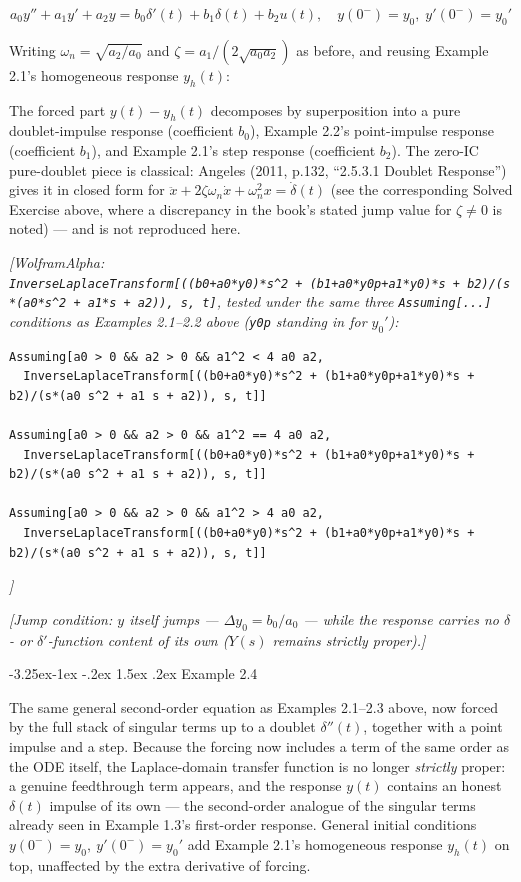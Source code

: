 \documentclass[
  11pt,
]{article}
\makeatletter
\renewcommand\paragraph{\@startsection{paragraph}{4}{\z@}%
                                     {-3.25ex\@plus -1ex \@minus -.2ex}%
                                     {1.5ex \@plus .2ex}%
                                     {\normalfont\normalsize\bfseries}}
\makeatother
\begin{document}
\[
a_0 y'' + a_1 y' + a_2 y = b_0 \delta'(t) + b_1 \delta(t) + b_2 u(t), \quad y(0^-) = y_0, \; y'(0^-) = y_0'
\]

Writing \(\omega_n = \sqrt{a_2/a_0}\) and
\(\zeta = a_1/(2\sqrt{a_0 a_2})\) as before, and reusing Example 2.1's
homogeneous response \(y_h(t)\):

The forced part \(y(t)-y_h(t)\) decomposes by superposition into a pure
doublet-impulse response (coefficient \(b_0\)), Example 2.2's
point-impulse response (coefficient \(b_1\)), and Example 2.1's step
response (coefficient \(b_2\)). The zero-IC pure-doublet piece is
classical: Angeles (2011, p.132, ``2.5.3.1 Doublet Response'') gives it
in closed form for
\(\ddot x+2\zeta\omega_n\dot x+\omega_n^2x=\dot\delta(t)\) (see the
corresponding Solved Exercise above, where a discrepancy in the book's
stated jump value for \(\zeta\neq0\) is noted) --- and is not reproduced
here.

\emph{{[}WolframAlpha:
\texttt{InverseLaplaceTransform{[}((b0+a0*y0)*s\^{}2\ +\ (b1+a0*y0p+a1*y0)*s\ +\ b2)/(s*(a0*s\^{}2\ +\ a1*s\ +\ a2)),\ s,\ t{]}},
tested under the same three \texttt{Assuming{[}...{]}} conditions as
Examples 2.1--2.2 above (\texttt{y0p} standing in for \(y_0'\)):}

\begin{verbatim}
Assuming[a0 > 0 && a2 > 0 && a1^2 < 4 a0 a2,
  InverseLaplaceTransform[((b0+a0*y0)*s^2 + (b1+a0*y0p+a1*y0)*s + b2)/(s*(a0 s^2 + a1 s + a2)), s, t]]

Assuming[a0 > 0 && a2 > 0 && a1^2 == 4 a0 a2,
  InverseLaplaceTransform[((b0+a0*y0)*s^2 + (b1+a0*y0p+a1*y0)*s + b2)/(s*(a0 s^2 + a1 s + a2)), s, t]]

Assuming[a0 > 0 && a2 > 0 && a1^2 > 4 a0 a2,
  InverseLaplaceTransform[((b0+a0*y0)*s^2 + (b1+a0*y0p+a1*y0)*s + b2)/(s*(a0 s^2 + a1 s + a2)), s, t]]
\end{verbatim}

\emph{{]}}

\emph{{[}Jump condition: \(y\) itself jumps --- \(\Delta y_0 = b_0/a_0\)
--- while the response carries no \(\delta\)- or \(\delta'\)-function
content of its own (\(Y(s)\) remains strictly proper).{]}}

\hypertarget{example-2.4}{%
\paragraph{Example 2.4}\label{example-2.4}}

The same general second-order equation as Examples 2.1--2.3 above, now
forced by the full stack of singular terms up to a doublet
\(\delta''(t)\), together with a point impulse and a step. Because the
forcing now includes a term of the same order as the ODE itself, the
Laplace-domain transfer function is no longer \emph{strictly} proper: a
genuine feedthrough term appears, and the response \(y(t)\) contains an
honest \(\delta(t)\) impulse of its own --- the second-order analogue of
the singular terms already seen in Example 1.3's first-order response.
General initial conditions \(y(0^-)=y_0,\ y'(0^-)=y_0'\) add Example
2.1's homogeneous response \(y_h(t)\) on top, unaffected by the extra
derivative of forcing.
\end{document}
